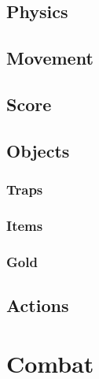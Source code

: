 \documentclass{report}
\begin{document}
\subsection{Physics}
\subsection{Movement}
\subsection{Score}
\subsection{Objects}
\subsubsection{Traps}
\subsubsection{Items}
\subsubsection{Gold}
\subsection{Actions}

\section{Combat}
\end{document}
